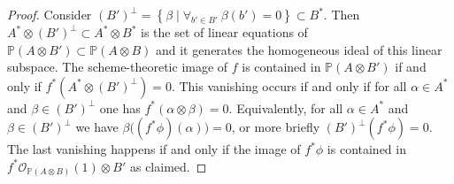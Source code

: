 \documentclass[10pt,a4paper]{amsart}
\def\PP{{\mathbb P}}
\newcommand{\ccO}{{\mathcal{O}}}
\newcommand{\set}[1]{\left\{#1\right\}}
\begin{document}
\begin{proof}
    Consider $(B')^{\perp} = \set{\beta\mid \forall_{b'\in B'} \ \beta(b')=0} \subset B^*$.
    Then $A^*\otimes(B')^\perp \subset A^* \otimes B^*$ is the set of linear equations of $\PP(A\otimes B')\subset \PP (A\otimes B)$ and it generates the homogeneous ideal of this linear subspace.
    The scheme-theoretic image of $f$ is contained in
       $\PP(A \otimes B')$ if and only if $f^*(A^*\otimes(B')^\perp) = 0$.
    This vanishing occurs
       if and only if
       for all $\alpha\in A^*$ and $\beta\in (B')^\perp$
       one has $f^*(\alpha\otimes \beta) =0$.
     Equivalently, for all $\alpha\in A^*$ and $\beta\in (B')^\perp$
       we have $\beta\bigl((f^*\phi)(\alpha)\bigr)=0$,
       or more briefly $(B')^{\perp} (f^*\phi) =0$.
      The last vanishing happens if and only if the image of  $f^*\phi$ is contained in $f^*\ccO_{\PP (A\otimes B)}(1) \otimes B'$
       as claimed.
\end{proof}
\end{document}
